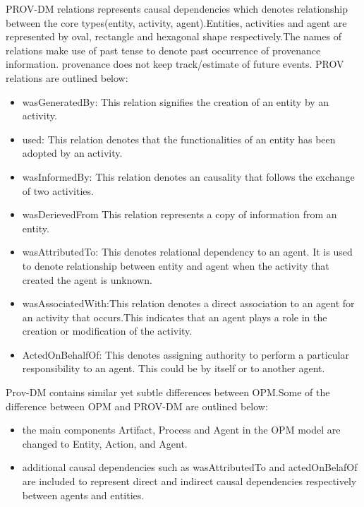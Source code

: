 PROV-DM relations represents causal dependencies which denotes relationship between the core types(entity, activity, agent).Entities, activities and agent are represented by oval, rectangle and hexagonal shape respectively.The names of relations make use of past tense to denote past occurrence of provenance information. provenance does not keep track/estimate of future events. PROV relations are outlined below:


\begin{itemize}
\item wasGeneratedBy: This relation signifies the creation of an entity by an activity. 

\item used: This relation denotes that the functionalities of an entity has been adopted by an activity.

\item wasInformedBy: This relation denotes an causality that follows the exchange of two activities.

\item wasDerievedFrom This relation represents a copy of information from an entity. 

\item wasAttributedTo: This denotes relational dependency to an agent. It is used to denote relationship between entity and agent when the activity that created the agent is unknown.

\item wasAssociatedWith:This relation denotes a direct association to an agent for an activity that occurs.This indicates that an agent plays a role in the creation or modification of the activity.

\item ActedOnBehalfOf: This denotes assigning authority to perform a particular responsibility to an agent. This could be by itself or to another agent.



\end{itemize}

Prov-DM contains similar yet subtle differences between OPM.Some of the difference between OPM and PROV-DM are outlined below:

\begin{itemize}

\item the main components Artifact, Process and Agent in the OPM model are changed to Entity, Action, and Agent. 

\item additional causal dependencies such as wasAttributedTo and actedOnBelafOf are included to represent direct and indirect causal dependencies respectively between agents and entities.

\end{itemize}

